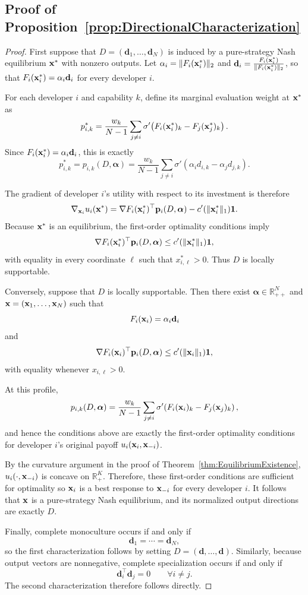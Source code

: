 \subsection{Proof of Proposition~\ref{prop:DirectionalCharacterization}}
\label{app:DirectionalCharacterization}
\DirectionalCharacterization*
\begin{proof}
First suppose that $D=(\mathbf d_1,\ldots,\mathbf d_N)$ is induced by a pure-strategy Nash equilibrium $\mathbf{x}^*$ with nonzero outputs.
Let $\alpha_i=\lVert F_i(\mathbf{x}_i^*)\rVert_2$ and  $\mathbf d_i = \frac{F_i(\mathbf{x}_i^*)}{\lVert F_i(\mathbf{x}_i^*)\rVert_2}$, so that $F_i(\mathbf{x}_i^*)=\alpha_i\mathbf d_i$
for every developer $i$.

For each developer $i$ and capability $k$, define its marginal evaluation weight at
$\mathbf{x}^*$ as
\[
p_{i,k}^*
=
\frac{w_k}{N-1}
\sum_{j\neq i}
\sigma'\!\left(
F_i(\mathbf{x}_i^*)_k-F_j(\mathbf{x}_j^*)_k
\right).
\]
Since $F_i(\mathbf{x}_i^*)=\alpha_i\mathbf d_i$, this is exactly
\[
p_{i,k}^*
=
p_{i,k}(D,\boldsymbol{\alpha})
=
\frac{w_k}{N-1}
\sum_{j\neq i}
\sigma'\!\left(
\alpha_i d_{i,k}-\alpha_j d_{j,k}
\right).
\]

The gradient of developer $i$'s utility with respect to its investment is therefore
\[
\nabla_{\mathbf{x}_i}u_i(\mathbf{x}^*)
=
\nabla F_i(\mathbf{x}_i^*)^\top
\mathbf p_i(D,\boldsymbol{\alpha})
-
c'(\lVert\mathbf{x}_i^*\rVert_1)\mathbf 1.
\]
Because $\mathbf{x}^*$ is an equilibrium, the first-order optimality conditions imply
\[
\nabla F_i(\mathbf{x}_i^*)^\top
\mathbf p_i(D,\boldsymbol{\alpha})
\leq
c'(\lVert\mathbf{x}_i^*\rVert_1)\mathbf 1,
\]
with equality in every coordinate $\ell$ such that $x_{i,\ell}^*>0$.
Thus $D$ is locally supportable.

Conversely, suppose that $D$ is locally supportable.
Then there exist $\boldsymbol{\alpha}\in\mathbb R_{++}^N$ and
$\mathbf{x}=(\mathbf{x}_1,\ldots,\mathbf{x}_N)$ such that
\[
F_i(\mathbf{x}_i)=\alpha_i\mathbf d_i
\]
and
\[
\nabla F_i(\mathbf{x}_i)^\top
\mathbf p_i(D,\boldsymbol{\alpha})
\leq
c'(\lVert\mathbf{x}_i\rVert_1)\mathbf 1,
\]
with equality whenever $x_{i,\ell}>0$.

At this profile,
\[
p_{i,k}(D,\boldsymbol{\alpha})
=
\frac{w_k}{N-1}
\sum_{j\neq i}
\sigma'\!\left(
F_i(\mathbf{x}_i)_k-F_j(\mathbf{x}_j)_k
\right),
\]
and hence the conditions above are exactly the first-order optimality
conditions for developer $i$'s original payoff $u_i(\mathbf{x}_i,\mathbf{x}_{-i})$.

By the curvature argument in the proof of Theorem~\ref{thm:EquilibriumExistence}, \(u_i(\cdot,\mathbf{x}_{-i})\) is concave on \(\mathbb R_+^K\). 
Therefore, these first-order conditions are sufficient for optimality so $\mathbf{x}_i$ is a best response to $\mathbf{x}_{-i}$ for every developer $i$.
It follows that $\mathbf{x}$ is a pure-strategy Nash equilibrium, and its normalized
output directions are exactly $D$.

Finally, complete monoculture occurs if and only if
\[
\mathbf d_1=\cdots=\mathbf d_N,
\]
so the first characterization follows by setting
$D=(\mathbf d,\ldots,\mathbf d)$.
Similarly, because output vectors are nonnegative, complete specialization
occurs if and only if
\[
\mathbf d_i^\top\mathbf d_j=0
\qquad\forall i\neq j.
\]
The second characterization therefore follows directly.
\end{proof}



